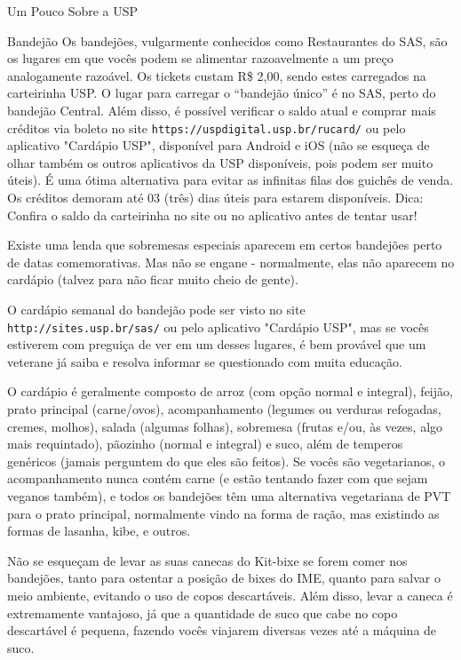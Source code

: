 \begin{secao}{Um Pouco Sobre a USP}
\begin{subsecao}{Bandejão}
Os bandejões, vulgarmente conhecidos como Restaurantes do SAS, são os lugares
em que vocês podem se alimentar razoavelmente a um preço analogamente razoável.
Os tickets custam R\$ 2,00, sendo estes carregados na carteirinha USP. O
lugar para carregar o ``bandejão único'' é no SAS, perto do bandejão
Central. Além disso, é possível verificar o saldo
atual e comprar mais créditos via boleto no site
{\tt https://uspdigital.usp.br/rucard/} ou pelo aplicativo "Cardápio USP",
disponível para Android e iOS (não se esqueça de olhar também os outros
aplicativos da USP disponíveis, pois podem ser muito úteis).
É uma ótima alternativa para evitar as infinitas filas dos guichês de venda. Os
créditos demoram até 03 (três) dias úteis para estarem disponíveis.
Dica: Confira o saldo da carteirinha no site ou no aplicativo antes de tentar usar!

Existe uma lenda que sobremesas especiais aparecem em certos bandejões perto de
datas comemorativas. Mas não se engane - normalmente, elas não aparecem no
cardápio (talvez para não ficar muito cheio de gente).

\cleardoublepage
{}

O cardápio semanal do bandejão pode ser visto no site {\tt
http://sites.usp.br/sas/} ou pelo aplicativo "Cardápio USP", mas se vocês
estiverem com preguiça de ver em um desses lugares, é
bem provável que um veterane já saiba e resolva informar se questionado com muita
educação.

O cardápio é geralmente composto de arroz (com opção normal e integral), feijão,
prato principal (carne/ovos), acompanhamento (legumes ou verduras refogadas,
cremes, molhos), salada (algumas folhas), sobremesa (frutas e/ou, às vezes, algo mais
requintado), pãozinho (normal e integral) e suco, além de temperos genéricos
(jamais perguntem do que eles são feitos). Se vocês são vegetarianos, o
acompanhamento nunca contém carne (e estão tentando fazer com que sejam veganos
também), e todos os bandejões têm uma alternativa vegetariana de PVT para o
prato principal, normalmente vindo na forma de ração, mas existindo as formas
de lasanha, kibe, e outros.


Não se esqueçam de levar as suas canecas do Kit-bixe se forem comer nos
bandejões, tanto para ostentar a posição de bixes do IME, quanto para salvar o
meio ambiente, evitando o uso de copos descartáveis. Além disso, levar a caneca
é extremamente vantajoso, já que a quantidade de suco que cabe no copo
descartável é pequena, fazendo vocês viajarem diversas vezes até a máquina de
suco.


\end{subsecao}
\end{secao}
